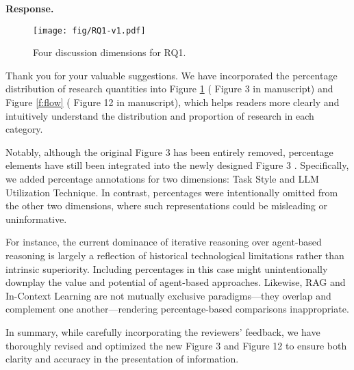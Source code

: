\documentclass[acmsmall]{acmart}
\begin{document}
	\noindent
	\textbf{Response.}

	\begin{figure}[t!]
		\centering
		\texttt{[image: fig/RQ1-v1.pdf]}
		\caption{Four discussion dimensions for RQ1.}
		\label{f:rq1}
	\end{figure}

	Thank you for your valuable suggestions. We have incorporated the percentage distribution of
	research quantities into Figure \ref{f:rq1} (
	\color{red}
	Figure 3
	\color{black}
	in manuscript) and Figure \ref{f:flow} (
	\color{red}
	Figure 12
	\color{black}
	in manuscript), which helps readers more clearly and intuitively understand the distribution and
	proportion of research in each category.

	Notably, although the original Figure 3 has been entirely removed, percentage elements have still
	been integrated into the newly designed
	\color{red}
	Figure 3
	\color{black}
	. Specifically, we added percentage annotations for two dimensions: Task Style and LLM Utilization
	Technique. In contrast, percentages were intentionally omitted from the other two dimensions,
	where such representations could be misleading or uninformative.

	For instance, the current dominance of iterative reasoning over agent-based reasoning is largely
	a reflection of historical technological limitations rather than intrinsic superiority.
	Including percentages in this case might unintentionally downplay the value and potential of
	agent-based approaches. Likewise, RAG and In-Context Learning are not mutually exclusive
	paradigms—they overlap and complement one another—rendering percentage-based comparisons
	inappropriate.

	In summary, while carefully incorporating the reviewers’ feedback, we have thoroughly revised
	and optimized the new
	\color{red}
	Figure 3
	\color{black}
	and
	\color{red}
	Figure 12
	\color{black}
	to ensure both clarity and accuracy in the presentation of information.
\end{document}
